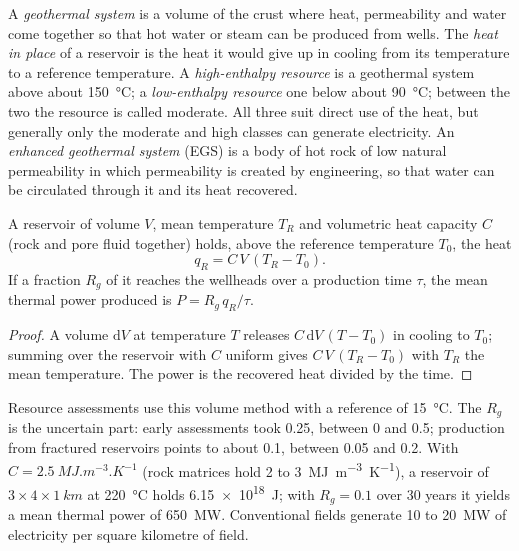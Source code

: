 \begin{definition}\label{def:b2:energy-geology:geothermal}
A \emph{geothermal system} is a volume of the crust where heat,
permeability and water come together so that hot water or steam can be produced from wells. The
\emph{heat in place} of a reservoir is the heat it would give up in cooling
from its temperature to a reference temperature. A \emph{high-enthalpy resource} is a geothermal system above about \qty{150}{\celsius}; a \emph{low-enthalpy
resource} one below about \qty{90}{\celsius}; between the two the
resource is called moderate. All three suit direct use of the heat, but generally only the moderate
and high classes can generate electricity. An \emph{enhanced geothermal system} (EGS) is a body of
hot rock of low natural permeability in which permeability is created by engineering, so that water
can be circulated through it and its heat recovered.
\end{definition}

\begin{proposition}\label{prop:b2:energy-geology:heat}
A reservoir of volume $V$, mean temperature $T_R$ and volumetric heat capacity $C$ (rock and pore
fluid together) holds, above the reference temperature $T_0$, the heat
\begin{equation}
q_R = C\,V\,(T_R - T_0) .
\label{eq:b2:energy-geology:heat}
\end{equation}
If a fraction $R_g$ of it reaches the wellheads over a production time $\tau$, the mean thermal
power produced is $P = R_g\,q_R/\tau$.
\end{proposition}

\begin{proof}
A volume $\mathrm{d}V$ at temperature $T$ releases $C\,\mathrm{d}V\,(T - T_0)$ in cooling to $T_0$;
summing over the reservoir with $C$ uniform gives $C\,V\,(T_R - T_0)$ with $T_R$ the mean
temperature. The power is the recovered heat divided by the time.
\end{proof}

Resource assessments use this volume method with a reference of \qty{15}{\celsius}. The  $R_g$ is the uncertain part: early assessments took 0.25, between 0 and 0.5; production from
fractured reservoirs points to about 0.1, between 0.05 and 0.2. With $C = \qty{2.5}{MJ.m^{-3}.K^{-1}}$
(rock matrices hold 2 to \qty{3}{MJ.m^{-3}.K^{-1}}), a reservoir of $3 \times 4 \times
\qty{1}{km}$ at \qty{220}{\celsius} holds \qty{6.15e18}{J}; with $R_g = 0.1$ over 30 years it
yields a mean thermal power of \qty{650}{MW}. Conventional fields generate 10 to
\qty{20}{MW} of electricity per square kilometre of field.

